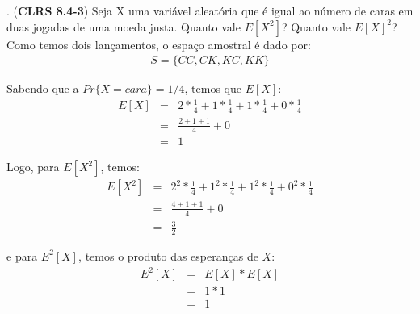 
. (\textbf{CLRS 8.4-3}) Seja X uma variável aleatória que é igual ao número de caras em duas jogadas de uma moeda justa. Quanto vale $E[X^2]$? Quanto vale $E[X]^2$?\\[6pt]

Como temos dois lançamentos, o espaço amostral é dado por:
\begin{eqnarray*}
S = \{CC, CK, KC, KK\}
\end{eqnarray*}

Sabendo que a $Pr\{X = cara\} = 1/4$, temos que $E[X]$:
\begin{eqnarray*}
  E[X] &=& 2 * \frac{1}{4} + 1 * \frac{1}{4} + 1 * \frac{1}{4} + 0 * \frac{1}{4} \\
  &=& \frac{2 + 1 + 1}{4} + 0 \\
  &=& 1
\end{eqnarray*}

Logo, para $E[X^2]$, temos:
\begin{eqnarray*}
  E[X^2] &=& 2^2 * \frac{1}{4} + 1^2 * \frac{1}{4} + 1^2 * \frac{1}{4} + 0^2 * \frac{1}{4} \\
  &=& \frac{4 + 1 + 1}{4} + 0 \\
  &=& \frac{3}{2}
\end{eqnarray*}

e para $E^2[X]$, temos o produto das esperanças de $X$:
\begin{eqnarray*}
E^2[X] &=& E[X]*E[X] \\
&=& 1 * 1 \\
&=& 1
\end{eqnarray*}